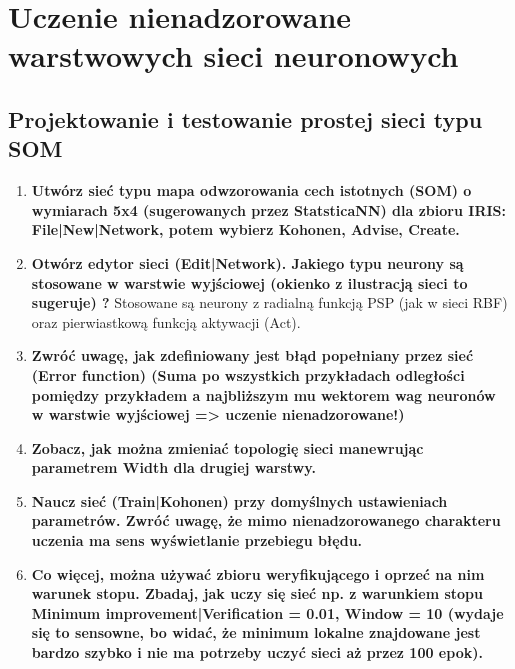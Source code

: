 
\section{Uczenie nienadzorowane warstwowych sieci neuronowych}

\subsection{Projektowanie i testowanie prostej sieci typu SOM}

\begin{enumerate}
\item \textbf{Utwórz sieć typu mapa odwzorowania cech istotnych (SOM) o wymiarach 5x4 (sugerowanych przez StatsticaNN) dla zbioru IRIS: File|New|Network, potem wybierz Kohonen, Advise, Create.}

\item \textbf{
Otwórz edytor sieci (Edit|Network). Jakiego typu neurony są stosowane w warstwie wyjściowej (okienko z ilustracją sieci to sugeruje) ?}
Stosowane są neurony z radialną funkcją PSP (jak w sieci RBF) oraz pierwiastkową funkcją aktywacji (Act).

\item \textbf{
Zwróć uwagę, jak zdefiniowany jest błąd popełniany przez sieć (Error function) (Suma po wszystkich przykładach odległości pomiędzy przykładem a najbliższym mu wektorem wag neuronów w warstwie wyjściowej => uczenie nienadzorowane!)}

\item \textbf{
Zobacz, jak można zmieniać topologię sieci manewrując parametrem Width dla drugiej warstwy.}

\item \textbf{
Naucz sieć (Train|Kohonen) przy domyślnych ustawieniach parametrów. Zwróć uwagę, że mimo nienadzorowanego charakteru uczenia ma sens wyświetlanie przebiegu błędu.}

\item \textbf{
Co więcej, można używać zbioru weryfikującego i oprzeć na nim warunek stopu. Zbadaj, jak uczy się sieć np. z warunkiem stopu Minimum improvement|Verification = 0.01, Window = 10 (wydaje się to sensowne, bo widać, że minimum lokalne znajdowane jest bardzo szybko i nie ma potrzeby uczyć sieci aż przez 100 epok).}


\end{enumerate}
